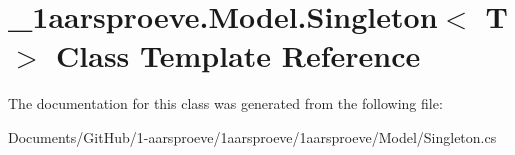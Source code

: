 \hypertarget{class__1aarsproeve_1_1_model_1_1_singleton}{}\section{\+\_\+1aarsproeve.\+Model.\+Singleton$<$ T $>$ Class Template Reference}
\label{class__1aarsproeve_1_1_model_1_1_singleton}


The documentation for this class was generated from the following file\+:\begin{DoxyCompactItemize}
\item 
Documents/\+Git\+Hub/1-\/aarsproeve/1aarsproeve/1aarsproeve/\+Model/Singleton.\+cs\end{DoxyCompactItemize}
